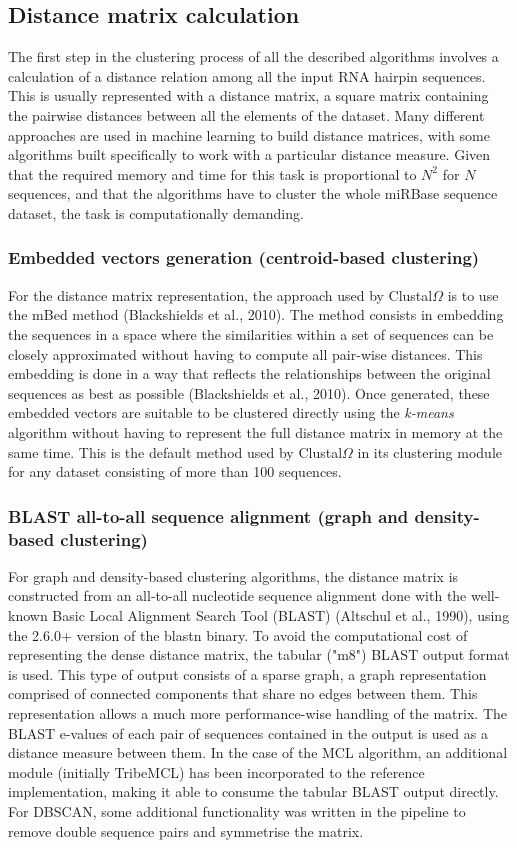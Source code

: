 \documentclass[nocrop]{bioinfo}
\begin{document}
\begin{methods}
\subsection{Distance matrix calculation}
The first step in the clustering process of all the described algorithms involves a calculation of a distance relation among all the input RNA hairpin sequences. This is usually represented with a distance matrix, a square matrix containing the pairwise distances between all the elements of the dataset. Many different approaches are used in machine learning to build distance matrices, with some algorithms built specifically to work with a particular distance measure. Given that the required memory and time for this task is proportional to $N^2$ for $N$ sequences, and that the algorithms have to cluster the whole miRBase sequence dataset, the task is computationally demanding.

\subsubsection{Embedded vectors generation (centroid-based clustering)}
For the distance matrix representation, the approach used by Clustal$\Omega$ is to use the mBed method (Blackshields et al., 2010). The method consists in embedding the sequences in a space where the similarities within a set of sequences can be closely approximated without having to compute all pair-wise distances. This embedding is done in a way that reflects the relationships between the original sequences as best as possible (Blackshields et al., 2010). Once generated, these embedded vectors are suitable to be clustered directly using the \textit{k-means} algorithm without having to represent the full distance matrix in memory at the same time. This is the default method used by Clustal$\Omega$ in its clustering module for any dataset consisting of more than 100 sequences.

\subsubsection{BLAST all-to-all sequence alignment (graph and density-based clustering)}
For graph and density-based clustering algorithms, the distance matrix is constructed from an all-to-all nucleotide sequence alignment done with the well-known Basic Local Alignment Search Tool (BLAST) (Altschul et al., 1990), using the 2.6.0+ version of the blastn binary. To avoid the computational cost of representing the dense distance matrix, the tabular ("m8") BLAST output format is used. This type of output consists of a sparse graph, a graph representation comprised of connected components that share no edges between them. This representation allows a much more performance-wise handling of the matrix. The BLAST e-values of each pair of sequences contained in the output is used as a distance measure between them. In the case of the MCL algorithm, an additional module (initially TribeMCL) has been incorporated to the reference implementation, making it able to consume the tabular BLAST output directly. For DBSCAN, some additional functionality was written in the pipeline to remove double sequence pairs and symmetrise the matrix.


\end{methods}
\end{document}

